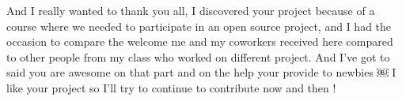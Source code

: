 \documentclass{beamer}
\begin{document}
\begin{frame}
    \Huge
    \begin{center}
    \end{center}
\end{frame}


\begin{frame}
    \begin{footnotesize}
        \begin{tcolorbox}[colback=github,colframe=blue!40!black,title=
                Julie Rymer - \href{https://gitter.im/Axelrod-Python/Axelrod?at=591388592b926f8a6741435d}
                {@Chadys} - (10 May 2017):
    ]
                And I really wanted to thank you all, I discovered your project because of a
                course where we needed to participate in an open source project, and I had the
                occasion to compare the welcome me and my coworkers received here compared to
                other people from my class who worked on different project. And I've got to said
                you are awesome on that part and on the help your provide to newbies ￼ I like
                your project so I'll try to continue to contribute now and then !
       \end{tcolorbox}
    \end{footnotesize}

 \end{frame}
\end{document}
